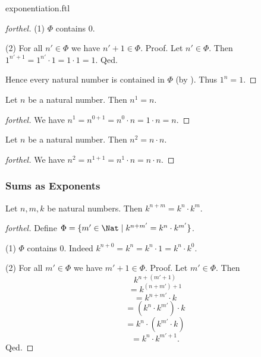 \documentclass{naproche-library}
\begin{document}
\begin{smodule}{exponentiation.ftl}
\begin{proof}[forthel]
    (1) $\Phi$ contains $0$.

    (2) For all $n' \in \Phi$ we have $n' + 1 \in \Phi$. \newline
    Proof.
      Let $n' \in \Phi$.
      Then $1^{n' + 1}
        = 1^{n'} \cdot 1
        = 1 \cdot 1
        = 1$.
    Qed.

    Hence every natural number is contained in $\Phi$ (by ).
    Thus $1^{n} = 1$.
  \end{proof}

  \begin{proposition}[forthel,id=ARITHMETIC_09_4975279749464064]
    Let $n$ be a natural number.
    Then $n^{1} = n$.
  \end{proposition}
  \begin{proof}[forthel]
    We have $n^{1}
      = n^{0 + 1}
      = n^{0} \cdot n
      = 1 \cdot n
      = n$.
  \end{proof}

  \begin{proposition}[forthel,id=ARITHMETIC_09_8513812055457792]
    Let $n$ be a natural number.
    Then $n^{2} = n \cdot n$.
  \end{proposition}
  \begin{proof}[forthel]
    We have $n^{2}
      = n^{1 + 1}
      = n^{1} \cdot n
      = n \cdot n$.
  \end{proof}


  \subsubsection*{Sums as Exponents}

  \begin{proposition}[forthel,id=ARITHMETIC_09_8152207530655744]
    Let $n, m, k$ be natural numbers.
    Then $k^{n + m} = k^{n} \cdot k^{m}$.
  \end{proposition}
  \begin{proof}[forthel]
    Define $\Phi = \{ m' \in \Nat \mid k^{n + m'} = k^{n} \cdot k^{m'} \}$.

    (1) $\Phi$ contains $0$. \newline
    Indeed $k^{n + 0}
      = k^{n}
      = k^{n} \cdot 1
      = k^{n} \cdot k^{0}$.

    (2) For all $m' \in \Phi$ we have $m' + 1 \in \Phi$. \newline
    Proof.
      Let $m' \in \Phi$.
      Then
      \[  k^{n + (m' + 1)}                  \]
      \[    = k^{(n + m') + 1}              \]
      \[    = k^{n + m'} \cdot k            \]
      \[    = (k^{n} \cdot k^{m'}) \cdot k  \]
      \[    = k^{n} \cdot (k^{m'} \cdot k)  \]
      \[    = k^{n} \cdot k^{m' + 1}.       \]
    Qed.


\end{proof}
\end{smodule}
\end{document}
